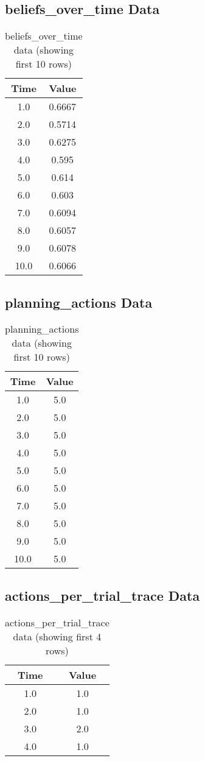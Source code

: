 \documentclass{article}
\begin{document}
\subsection{beliefs_over_time Data}
\begin{table}[h]
\centering
\begin{tabular}{cc}
\toprule
Time & Value \\
\midrule
1.0 & 0.6667 \\
2.0 & 0.5714 \\
3.0 & 0.6275 \\
4.0 & 0.595 \\
5.0 & 0.614 \\
6.0 & 0.603 \\
7.0 & 0.6094 \\
8.0 & 0.6057 \\
9.0 & 0.6078 \\
10.0 & 0.6066 \\
\bottomrule
\end{tabular}
\caption{beliefs_over_time data (showing first 10 rows)}
\end{table}

\subsection{planning_actions Data}
\begin{table}[h]
\centering
\begin{tabular}{cc}
\toprule
Time & Value \\
\midrule
1.0 & 5.0 \\
2.0 & 5.0 \\
3.0 & 5.0 \\
4.0 & 5.0 \\
5.0 & 5.0 \\
6.0 & 5.0 \\
7.0 & 5.0 \\
8.0 & 5.0 \\
9.0 & 5.0 \\
10.0 & 5.0 \\
\bottomrule
\end{tabular}
\caption{planning_actions data (showing first 10 rows)}
\end{table}

\subsection{actions_per_trial_trace Data}
\begin{table}[h]
\centering
\begin{tabular}{cc}
\toprule
Time & Value \\
\midrule
1.0 & 1.0 \\
2.0 & 1.0 \\
3.0 & 2.0 \\
4.0 & 1.0 \\
\bottomrule
\end{tabular}
\caption{actions_per_trial_trace data (showing first 4 rows)}
\end{table}
\end{document}
